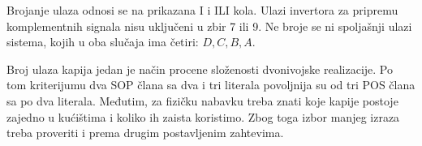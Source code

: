 
Brojanje ulaza odnosi se na prikazana I i ILI kola. Ulazi invertora za pripremu komplementnih signala nisu uključeni u zbir 7 ili 9. Ne broje se ni spoljašnji ulazi sistema, kojih u oba slučaja ima četiri: \(D,C,B,A\).

Broj ulaza kapija jedan je način procene složenosti dvonivojske realizacije. Po tom kriterijumu dva SOP člana sa dva i tri literala povoljnija su od tri POS člana sa po dva literala. Međutim, za fizičku nabavku treba znati koje kapije postoje zajedno u kućištima i koliko ih zaista koristimo. Zbog toga izbor manjeg izraza treba proveriti i prema drugim postavljenim zahtevima.
